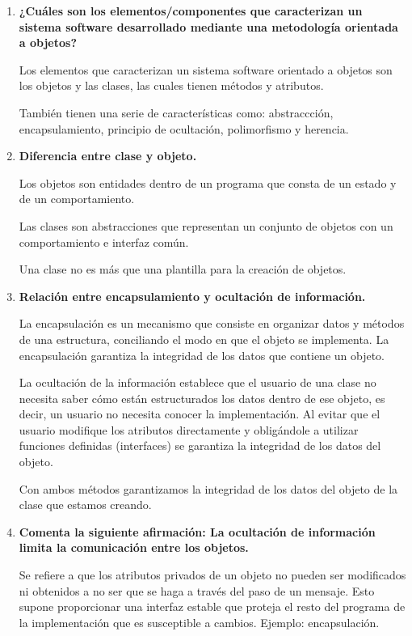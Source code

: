 \documentclass[12pt,letterpaper]{article}
\begin{document}
	\begin{enumerate}
		\item \textbf{¿Cuáles son los elementos/componentes que caracterizan un sistema software
		desarrollado mediante una metodología orientada a objetos?}
		
		Los elementos que caracterizan un sistema software orientado a objetos son los objetos y las clases, las cuales tienen métodos y atributos.
		
		También tienen una serie de características como: abstraccción, encapsulamiento, principio de ocultación, polimorfismo y herencia.
		
		\item \textbf{Diferencia entre clase y objeto.}
		
		Los objetos son entidades dentro de un programa que consta de un estado y de un comportamiento.
		
		Las clases son abstracciones que representan un conjunto de objetos con un comportamiento e interfaz común.
		
		Una clase no es más que una plantilla para la creación de objetos.
		
		\item \textbf{Relación entre encapsulamiento y ocultación de información.}
		
		La encapsulación es un mecanismo que consiste en organizar datos y métodos de una estructura, conciliando el modo en que el objeto se implementa. La encapsulación garantiza la integridad de los datos que contiene un objeto.
		
		La ocultación de la información establece que el usuario de una clase no necesita saber cómo están estructurados los datos dentro de ese objeto, es decir, un usuario no necesita
		conocer la implementación. Al evitar que el usuario modifique los atributos directamente y obligándole a utilizar funciones definidas (interfaces) se garantiza la
		integridad de los datos del objeto.
		
		Con ambos métodos garantizamos la integridad de los datos del objeto de la clase que estamos creando.
		
		\item \textbf{Comenta la siguiente afirmación: La ocultación de información limita la comunicación entre los objetos.}
		
		Se refiere a que los atributos privados de un objeto no pueden ser modificados ni obtenidos a no ser que se haga a través del paso de un mensaje. Esto supone proporcionar una interfaz estable que proteja el resto del programa de la
		implementación que es susceptible a cambios. Ejemplo: encapsulación.
		

\end{enumerate}
\end{document}
